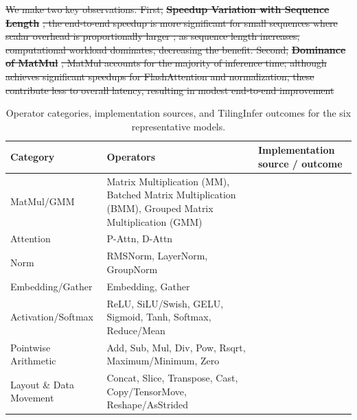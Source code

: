 \documentclass[manuscript,screen,review]{acmart}
\theoremstyle{indenteditalic}
\providecommand{\DIFidentity}[1]{#1}
\providecommand{\DIFdeltex}[1]{{%
  \protect\color{red}%
  \normalfont\normalsize
  \let\textbf\DIFidentity
  \let\textit\DIFidentity
  \let\texttt\DIFidentity
  \let\textsc\DIFidentity
  \let\textsf\DIFidentity
  \let\emph\DIFidentity
  \let\uline\DIFidentity
  \sout{#1}%
}} %
\providecommand{\DIFaddbegin}{} %
\providecommand{\DIFdelbegin}{} %
\providecommand{\DIFdelend}{} %
\providecommand{\DIFdel}[1]{\texorpdfstring{\DIFdeltex{#1}}{}} %
\begin{document}
\DIFdelbegin \DIFdel{We make two key observations. First, }\textbf{\DIFdel{Speedup Variation with Sequence Length}}%
\DIFdel{, the end-to-end speedup is more significant for small sequences where scalar overhead is proportionally larger ; as sequence length increases, computational workload dominates, decreasing the benefit. Second, }\textbf{\DIFdel{Dominance of MatMul}}%
\DIFdel{, MatMul accounts for the majority of inference time; although }\textbf{%
} %
\DIFdel{achieves significant speedups for FlashAttention and normalization, these contribute less to overall latency, resulting in modest end-to-end improvement}\DIFdelend \DIFaddbegin \begin{table}[H]
	\caption{Operator categories, implementation sources, and TilingInfer outcomes for the six representative models.}
	\label{tab:eval:model-operator-categories}
	\centering
	\scriptsize
	\setlength{\tabcolsep}{3pt}
	\renewcommand{\arraystretch}{0.88}
	\begin{tabularx}{\columnwidth}{@{}l>{\raggedright\arraybackslash}Xl@{}}
		\toprule
		\textbf{Category} & \textbf{Operators} & \textbf{Implementation source / outcome} \\
		\midrule
		MatMul/GMM &
		Matrix Multiplication (MM), Batched Matrix Multiplication (BMM), Grouped Matrix Multiplication (GMM) &
		 \\
		Attention & P-Attn, D-Attn & \\
		Norm & RMSNorm, LayerNorm, GroupNorm & \\
		\midrule
		Embedding/Gather & Embedding, Gather &
		 \\
		Activation/Softmax & ReLU, SiLU/Swish, GELU, Sigmoid, Tanh, Softmax, Reduce/Mean & \\
		Pointwise Arithmetic & Add, Sub, Mul, Div, Pow, Rsqrt, Maximum/Minimum, Zero & \\
		Layout \& Data Movement & Concat, Slice, Transpose, Cast, Copy/TensorMove, Reshape/AsStrided & \\
		\bottomrule
	\end{tabularx}
	\vspace{-6pt}
\end{table}
\end{document}
